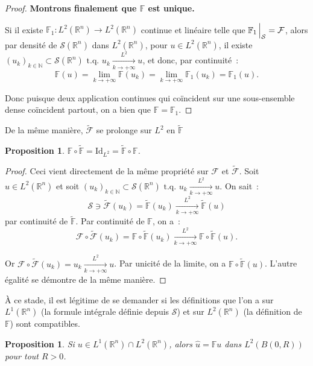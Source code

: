 \documentclass{report}
\newcommand{\R}{{\mathbb R}}
\newcommand{\N}{{\mathbb N}}
\newcommand{\tq}{\text{ t.q. }}
\newcommand{\st}{\tq}
\newcommand{\pinfty}{{+\infty}}
\newcommand{\Id}{\mathrm {Id}}
\newtheorem{prp}[thm]{Proposition}
\theoremstyle{definition}
\theoremstyle{remark}
\begin{document}
\begin{proof}
\textbf{Montrons finalement que $\mathbb F$ est unique.}

Si il existe $\mathbb F_1 : L^2(\R^n) \to L^2(\R^n)$ continue et linéaire telle que $\mathbb F_1\sVert[2]_{\mathcal S} = \mathcal F$, alors par densité de $\mathcal S(\R^n)$
dans $L^2(\R^n)$, pour $u \in L^2(\R^n)$, il existe $(u_k)_{k \in \N} \subset \mathcal S(\R^n) \tq u_k \xrightarrow[k \to \pinfty]{L^2} u$, et donc, par continuité~:
\[\mathbb F(u) = \lim_{k \to \pinfty} \mathbb F(u_k) = \lim_{k \to \pinfty} \mathbb F_1(u_k) = \mathbb F_1(u).\]

Donc puisque deux application continues qui coïncident sur une sous-ensemble dense coïncident partout, on a bien que $\mathbb F = \mathbb F_1$.
\end{proof}

De la même manière, $\tilde {\mathcal F}$ se prolonge sur $L^2$ en $\tilde {\mathbb F}$

\begin{prp} $\mathbb F \circ \tilde {\mathbb F} = \Id_{L^2} = \tilde {\mathbb F} \circ \mathbb F$.
\end{prp}

\begin{proof} Ceci vient directement de la même propriété sur $\mathcal F$ et $\tilde {\mathcal F}$. Soit $u \in L^2(\R^n)$ et soit
$(u_k)_{k \in \N} \subset \mathcal S(\R^n) \st u_k \xrightarrow[k \to \pinfty]{L^2} u$. On sait~:
\[\mathcal S \ni \tilde {\mathcal F}(u_k) = \tilde {\mathbb F}(u_k) \xrightarrow[k \to \pinfty]{L^2} \tilde {\mathbb F}(u)\]
par continuité de $\tilde {\mathbb F}$. Par continuité de $\mathbb F$, on a~:
\[\mathcal F \circ \tilde {\mathcal F}(u_k) = \mathbb F \circ \tilde {\mathbb F}(u_k) \xrightarrow[k \to \pinfty]{L^2} \mathbb F \circ \tilde {\mathbb F}(u).\]

Or $\mathcal F \circ \tilde {\mathcal F}(u_k) = u_k \xrightarrow[k \to \pinfty]{L^2} u$. Par unicité de la limite, on a $\mathbb F \circ \tilde {\mathbb F}(u)$.
L'autre égalité se démontre de la même manière.
\end{proof}

À ce stade, il est légitime de se demander si les définitions que l'on a sur $L^1(\R^n)$ (la formule intégrale définie depuis $\mathcal S$) et sur $L^2(\R^n)$
(la définition de $\mathbb F$) sont compatibles.

\begin{prp} Si $u \in L^1(\R^n) \cap L^2(\R^n)$, alors $\hat u = \mathbb Fu$ dans $L^2\left({B(0, R)}\right)$ pour tout $R > 0$.
\end{prp}
\end{document}
